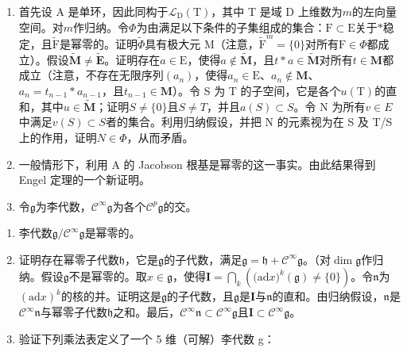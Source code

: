 \begin{enumerate}
\def\labelenumi{\arabic{enumi}.}
\item
  首先设 A 是单环，因此同构于\(\mathcal{L}_{\mathrm{D}}(\mathrm{T})\)，其中 T 是域 D 上维数为\(m\)的左向量空间。对\(m\)作归纳。令\(\Phi\)为由满足以下条件的子集组成的集合：\(\mathrm{F} \subset \mathrm{E}\)关于\(*\)稳定，且\(\tilde{\mathrm{F}}\)是幂零的。证明\(\tilde{\Phi}\)具有极大元 M（注意，\(\tilde{\mathrm{F}}^m = \{0\}\)对所有\(\mathrm{F} \in \Phi\)都成立）。假设\(\tilde{\mathbf{M}} \neq \tilde{\mathbf{E}}\)。证明存在\(a \in \mathrm{E}\)，使得\(a \notin \tilde{\mathbf{M}}\)，且\(t * a \in \tilde{\mathbf{M}}\)对所有\(t \in \mathbf{M}\)都成立（注意，不存在无限序列\((a_n)\)，使得\(a_n \in \mathrm{E}\)、\(a_n \notin \mathbf{M}\)、\(a_n = t_{n-1} * a_{n-1}\)，且\(t_{n-1} \in \mathbf{M}\)）。令 S 为 T 的子空间，它是各个\(u(\mathrm{T})\)的直和，其中\(u \in \tilde{\mathbf{M}}\)；证明\(S \neq \{0\}\)且\(S \neq T\)，并且\(a(S) \subset S\)。令 N 为所有\(v \in E\)中满足\(v(S) \subset S\)者的集合。利用归纳假设，并把 N 的元素视为在 S 及 T/S 上的作用，证明\(N \in \Phi\)，从而矛盾。
\item
  一般情形下，利用 A 的 Jacobson 根基是幂零的这一事实。由此结果得到 Engel 定理的一个新证明。
\item
  令\(\mathfrak{g}\)为李代数，\(\mathcal{C}^{\infty}\mathfrak{g}\)为各个\(\mathcal{C}^p\mathfrak{g}\)的交。
\end{enumerate}

\begin{enumerate}
\def\labelenumi{(\alph{enumi})}
\item
 李代数\(\mathfrak{g} / \mathcal{C}^{\infty}\mathfrak{g}\)是幂零的。
\item
  证明存在幂零子代数\(\mathfrak{h}\)，它是\(\mathfrak{g}\)的子代数，满足\(\mathfrak{g} = \mathfrak{h} + \mathcal{C}^{\infty}\mathfrak{g}\)。（对\(\dim \mathfrak{g}\)作归纳。假设\(\mathfrak{g}\)不是幂零的。取\(x\in \mathfrak{g}\)，使得\(\mathbf{I} = \bigcap_{k}\left(\mathrm{(ad}x)^{k}(\mathfrak{g})\neq \{0\}\right)\)。令\(\mathfrak{n}\)为\((\mathrm{ad}x)^k\)的核的并。证明这是\(\mathfrak{g}\)的子代数，且\(\mathfrak{g}\)是\(\mathbf{I}\)与\(\mathfrak{n}\)的直和。由归纳假设，\(\mathfrak{n}\)是\(\mathcal{C}^{\infty}\mathfrak{n}\)与幂零子代数\(\mathfrak{h}\)之和。最后，\(\mathcal{C}^{\infty}\mathfrak{n}\subset \mathcal{C}^{\infty}\mathfrak{g}\)且\(\mathbf{I}\subset \mathcal{C}^{\infty}\mathfrak{g}\)。
\item
  验证下列乘法表定义了一个 5 维（可解）李代数 g：
\end{enumerate}

